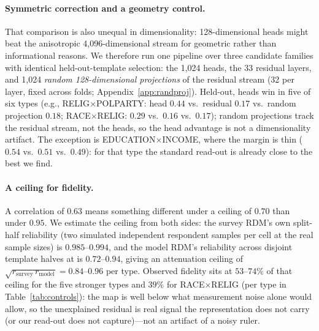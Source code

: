 \paragraph{Symmetric correction and a geometry control.} That comparison
is also unequal in dimensionality: 128-dimensional heads might beat the
anisotropic 4{,}096-dimensional stream for geometric rather than
informational reasons. We therefore run one pipeline over three candidate families with
identical held-out-template selection: the 1{,}024 heads, the 33 residual
layers, and 1{,}024 \emph{random 128-dimensional projections} of the
residual stream (32 per layer, fixed across folds;
Appendix~\ref{app:randproj}). Held-out, heads win in five of six
types (e.g., RELIG$\times$POLPARTY: head $0.44$
vs.\ residual $0.17$ vs.\ random projection $0.18$; RACE$\times$RELIG:
$0.29$ vs.\ $0.16$ vs.\ $0.17$); random projections track the residual
stream, not the heads, so the head advantage is not a
dimensionality artifact. The exception is EDUCATION$\times$INCOME, where
the margin is thin ($0.54$ vs.\ $0.51$ vs.\ $0.49$): for that type the
standard read-out is already close to the best we find.

\paragraph{A ceiling for fidelity.} A correlation of $0.63$
means something different under a ceiling of $0.70$ than under $0.95$. We
estimate the ceiling from both sides: the survey RDM's own split-half
reliability (two simulated independent respondent samples per cell at the
real sample sizes) is $0.985$--$0.994$, and the model RDM's reliability
across disjoint template halves at \starhead{} is $0.72$--$0.94$, giving
an attenuation ceiling of $\sqrt{r_{\text{survey}}\,r_{\text{model}}} =
0.84$--$0.96$ per type. Observed fidelity sits at $53$--$74\%$ of that
ceiling for the five stronger types and $39\%$ for RACE$\times$RELIG
(per type in Table~\ref{tab:controls}):
the map is well below what measurement noise alone would allow, so the
unexplained residual is real signal the representation does not carry
(or our read-out does not capture)---not an artifact of a noisy ruler.


